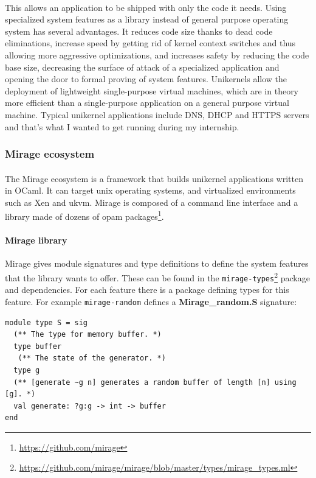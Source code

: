 \documentclass[a4paper]{article}
\begin{document}
\paragraph{}
This allows an application to be shipped with only the code it needs. Using specialized system features as a library instead of general purpose operating system has several advantages. It reduces code size thanks to dead code eliminations, increase speed by getting rid of kernel context switches and thus allowing more aggressive optimizations, and increases safety by reducing the code base size, decreasing the surface of attack of a specialized application and opening the door to formal proving of system features. Unikernels allow the deployment of lightweight single-purpose virtual machines, which are in theory more efficient than a single-purpose application on a general purpose virtual machine. Typical unikernel applications include DNS, DHCP and HTTPS\cite{mehnert2014transport} servers and that's what I wanted to get running during my internship.
\subsubsection{Mirage ecosystem}
\paragraph{}
The Mirage ecosystem is a framework that builds unikernel applications written in OCaml. It can target unix operating systems, and virtualized environments such as Xen \cite{barham2003xen} and ukvm. Mirage is composed of a command line interface and a library made of dozens of opam packages\footnote{\url{https://github.com/mirage}}. 

\paragraph{Mirage library}
Mirage gives module signatures and type definitions to define the system features that the library wants to offer. 
These can be found in the \texttt{mirage-types}\footnote{\url{https://github.com/mirage/mirage/blob/master/types/mirage\_types.ml}} 
package and dependencies. For each feature there is a package defining types for this feature. 
For example \texttt{mirage-random} defines a \textbf{Mirage\_random.S} signature:
\begin{verbatim}
module type S = sig
  (** The type for memory buffer. *)
  type buffer                         
   (** The state of the generator. *)
  type g                             
  (** [generate ~g n] generates a random buffer of length [n] using [g]. *)
  val generate: ?g:g -> int -> buffer 
end
\end{verbatim}
\end{document}
